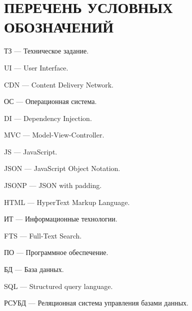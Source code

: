 \section*{ПЕРЕЧЕНЬ УСЛОВНЫХ ОБОЗНАЧЕНИЙ}

ТЗ — Техническое задание.

UI — User Interface.

CDN — Content Delivery Network.

ОС — Операционная система.

DI — Dependency Injection.

MVC — Model-View-Controller.

JS — JavaScript.

JSON — JavaScript Object Notation.

JSONP — JSON with padding.

HTML — HyperText Markup Language.

ИТ — Информационные технологии.

FTS — Full-Text Search.

ПО — Программное обеспечение.

БД — База данных.

SQL — Structured query language.

РСУБД — Реляционная система управления базами данных.


